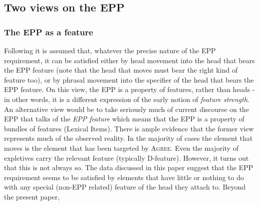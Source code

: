 \documentclass[11pt]{article}
\begin{document}
\subsection{Two views on the EPP} \label{EPP1}

\subsubsection{The EPP as a feature}

Following \citet{alexiadou-anagnostopoulou:98} it is  assumed that, whatever the precise nature of the EPP requirement, it can be satisfied either by head movement into the head that bears the EPP feature (note that the head that moves must bear the right kind of feature too), or by phrasal movement into the specifier of the head that bears the EPP feature.  On this view, the EPP is a property of features, rather than heads - in other words, it is a different expression of the early notion of \textit{feature strength}.  
An alternative view would be to take seriously much of current discourse on the EPP that talks of the \textit{EPP feature} which means that the EPP is a property of bundles of features (Lexical Items).  There is ample evidence that the former view represents much of the observed reality.  In the majority of cases the element that moves is the element that has been targeted by \textsc{Agree}.  Even the majority of expletives carry the relevant feature (typically D-feature).  However, it turns out that this is not always so. The data discussed in this paper suggest that  the EPP requirement seems to be satisfied by elements that have little or nothing to do with any special (non-EPP related) feature of the head they attach to.  Beyond the present paper, 
\end{document}
